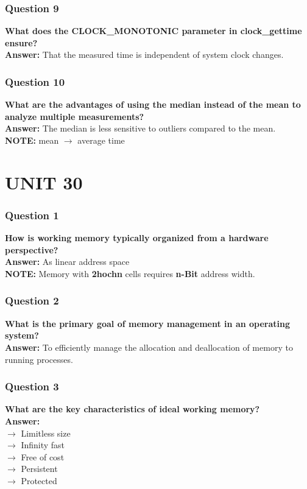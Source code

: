 \documentclass{article}
\begin{document}
\subsubsection*{Question 9}
\textbf{What does the CLOCK\_MONOTONIC parameter in clock\_gettime ensure?} \\
\textbf{Answer:} That the measured time is independent of system clock changes.

\subsubsection*{Question 10}
\textbf{What are the advantages of using the median instead of the mean to analyze multiple measurements?} \\
\textbf{Answer:} The median is less sensitive to outliers compared to the mean. \\
\textbf{NOTE:} mean $\rightarrow$ average time

\section*{UNIT 30}

\subsubsection*{Question 1}
\textbf{How is working memory typically organized from a hardware perspective?} \\
\textbf{Answer:} As linear address space \\
\textbf{NOTE:} Memory with \textbf{2hochn} cells requires \textbf{n-Bit} address width.

\subsubsection*{Question 2}
\textbf{What is the primary goal of memory management in an operating system?} \\
\textbf{Answer:} To efficiently manage the allocation and deallocation of memory to running processes.

\subsubsection*{Question 3}
\textbf{What are the key characteristics of ideal working memory?} \\
\textbf{Answer:} \\
$\rightarrow$ Limitless size \\
$\rightarrow$ Infinity fast \\
$\rightarrow$ Free of cost \\
$\rightarrow$ Persistent \\
$\rightarrow$ Protected
\end{document}
